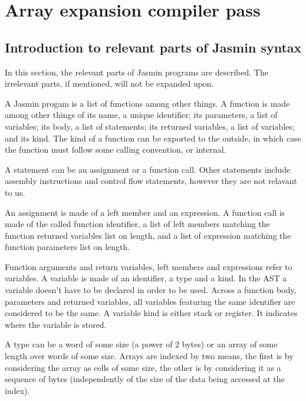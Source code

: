 \documentclass{article}
\begin{document}
\section{Array expansion compiler pass}\label{sec:syntax}

\subsection{Introduction to relevant parts of Jasmin syntax}

In this section, the relevant parts of Jasmin programs are described. The
irrelevant parts, if mentioned, will not be expanded upon.

A Jasmin progam is a list of functions among other things. A function is made
among other things of its name, a unique identifier; its parameters, a list of
variables; its body, a list of statements; its returned variables, a list of
variables; and its kind. The kind of a function can be exported to the outside,
in which case the function must follow some calling convention, or internal.

\smallskip

A statement can be an assignment or a function call.
Other statements include assembly instructions and control flow statements,
however they are not relavant to us.

An assignment is made of a left member and an expression. A function call is
made of the called function identifier, a list of left members matching the
function returned variables list on length, and a list of expression matching
the function parameters list on length.

Function arguments and return variables, left members and expressions refer to
variables. A variable is made of an identifier, a type and a kind. In the AST a
variable doesn't have to be declared in order to be used. Across a function
body, parameters and returned variables, all variables featuring the same
identifier are considered to be the same. A variable kind is either stack or
register. It indicates where the variable is stored.

\smallskip

A type can be a word of some size (a power of 2 bytes) or an array of some
length over words of some size. Arrays are indexed by two means, the first is
by considering the array as cells of some size, the other is by considering it
as a sequence of bytes (independently of the size of the data being accessed at
the index).
\end{document}
